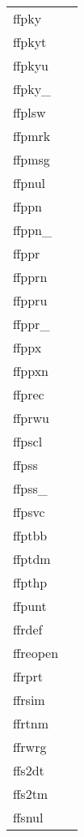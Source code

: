 \documentclass[11pt]{book}
\begin{document}
\begin{tabular}{lr}

ffpky          & \pageref{ffpky} \\
ffpkyt   & \pageref{ffpkyt} \\
ffpkyu     & \pageref{ffpkyu} \\
ffpky\_      & \pageref{ffpkyx} \\
ffplsw & \pageref{ffplsw} \\
ffpmrk   & \pageref{ffpmrk} \\
ffpmsg   & \pageref{ffpmsg} \\
ffpnul    & \pageref{ffpnul} \\
ffppn     & \pageref{ffppn} \\
ffppn\_ & \pageref{ffppnx} \\
ffppr        & \pageref{ffppr} \\
ffpprn & \pageref{ffpprn} \\
ffppru & \pageref{ffppru} \\
ffppr\_    & \pageref{ffpprx} \\
ffppx & \pageref{ffppx} \\
ffppxn & \pageref{ffppxn} \\
ffprec       & \pageref{ffprec} \\
ffprwu      & \pageref{ffpclu} \\
ffpscl     & \pageref{ffpscl} \\
ffpss    & \pageref{ffpss} \\
ffpss\_  & \pageref{ffpssx} \\
ffpsvc    & \pageref{ffpsvc} \\
ffptbb  & \pageref{ffptbb} \\
ffptdm         & \pageref{ffptdm} \\
ffpthp    & \pageref{ffpthp} \\
ffpunt     & \pageref{ffpunt} \\
ffrdef   & \pageref{ffrdef} \\
ffreopen      & \pageref{ffreopen} \\
ffrprt   & \pageref{ffrprt} \\
ffrsim     & \pageref{ffrsim} \\
ffrtnm & \pageref{ffrtnm} \\
ffrwrg    & \pageref{ffrwrg} \\
ffs2dt  & \pageref{ffdt2s} \\
ffs2tm  & \pageref{ffdt2s} \\
ffsnul   & \pageref{ffsnul} \\

\end{tabular}
\end{document}
